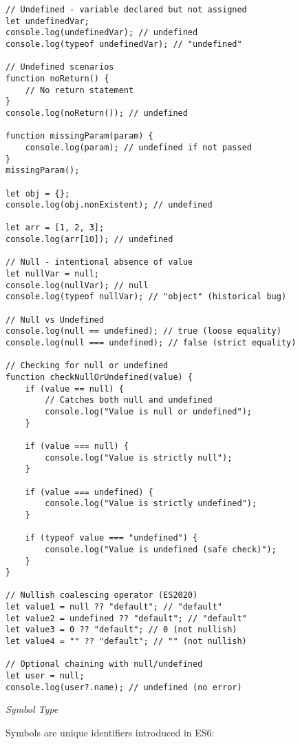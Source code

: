\documentclass[12pt,a4paper,oneside]{book}
\newcommand{\mysubsubsection}[1]{%
    \vspace{0.1em}
    {\normalsize\itshape #1}
    \vspace{0.1em}
}
\begin{document}
\begin{lstlisting}[style=javascript, caption={\textbf{Undefined and Null Types}}, label=lst:undefined-null]
// Undefined - variable declared but not assigned
let undefinedVar;
console.log(undefinedVar); // undefined
console.log(typeof undefinedVar); // "undefined"

// Undefined scenarios
function noReturn() {
    // No return statement
}
console.log(noReturn()); // undefined

function missingParam(param) {
    console.log(param); // undefined if not passed
}
missingParam();

let obj = {};
console.log(obj.nonExistent); // undefined

let arr = [1, 2, 3];
console.log(arr[10]); // undefined

// Null - intentional absence of value
let nullVar = null;
console.log(nullVar); // null
console.log(typeof nullVar); // "object" (historical bug)

// Null vs Undefined
console.log(null == undefined); // true (loose equality)
console.log(null === undefined); // false (strict equality)

// Checking for null or undefined
function checkNullOrUndefined(value) {
    if (value == null) {
        // Catches both null and undefined
        console.log("Value is null or undefined");
    }
    
    if (value === null) {
        console.log("Value is strictly null");
    }
    
    if (value === undefined) {
        console.log("Value is strictly undefined");
    }
    
    if (typeof value === "undefined") {
        console.log("Value is undefined (safe check)");
    }
}

// Nullish coalescing operator (ES2020)
let value1 = null ?? "default"; // "default"
let value2 = undefined ?? "default"; // "default"
let value3 = 0 ?? "default"; // 0 (not nullish)
let value4 = "" ?? "default"; // "" (not nullish)

// Optional chaining with null/undefined
let user = null;
console.log(user?.name); // undefined (no error)
\end{lstlisting}

\mysubsubsection{Symbol Type}

Symbols are unique identifiers introduced in ES6:
\end{document}

